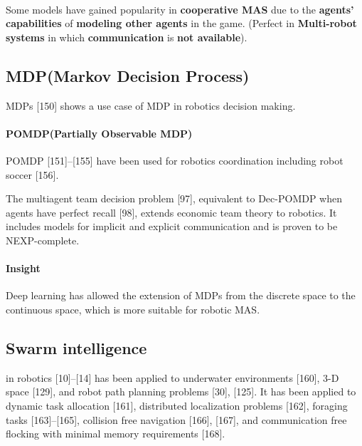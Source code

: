 \documentclass{article}
\begin{document}
   		\\
   		Some models have gained popularity in \textbf{cooperative MAS} due to the \textbf{agents’ capabilities} of \textbf{modeling other agents} in the game. (Perfect in \textbf{Multi-robot systems} in which \textbf{communication} is \textbf{not available})\citep{rizk-2018-decision-making-in-multiagent-systems-a-survey}.
   		
   		\subsection{MDP(Markov Decision Process)}
   			MDPs \citet{rizk-2019-cooperative-heterogeneous-multi-robot-systems-a-survey}[150] shows a use case of MDP in robotics decision making.  
   			
   			\paragraph{POMDP(Partially Observable MDP)} POMDP \cite{rizk-2018-decision-making-in-multiagent-systems-a-survey}[151]–[155] have been used for robotics coordination including robot soccer \citet{rizk-2018-decision-making-in-multiagent-systems-a-survey}[156].
   			
			The multiagent team decision problem \citet{rizk-2018-decision-making-in-multiagent-systems-a-survey}[97], equivalent to Dec-POMDP when agents have perfect recall \cite{rizk-2018-decision-making-in-multiagent-systems-a-survey}[98], extends economic team theory to robotics.  It includes models for implicit and explicit communication and is proven to be NEXP-complete. 
			
			\paragraph{Insight}  Deep learning has allowed the extension of MDPs from the discrete space to the
			continuous space, which is more suitable for robotic MAS.
			
   		
   		\subsection{Swarm intelligence}
   		in robotics \citet{rizk-2018-decision-making-in-multiagent-systems-a-survey}[10]–[14] has been applied to underwater environments \citet{rizk-2018-decision-making-in-multiagent-systems-a-survey}[160], 3-D space \citet{rizk-2018-decision-making-in-multiagent-systems-a-survey}[129], and robot path planning problems \citet{rizk-2018-decision-making-in-multiagent-systems-a-survey}[30], [125]. It has been applied to dynamic task allocation \citet{rizk-2018-decision-making-in-multiagent-systems-a-survey}[161], distributed localization problems \citet{rizk-2018-decision-making-in-multiagent-systems-a-survey}[162], foraging tasks \citet{rizk-2018-decision-making-in-multiagent-systems-a-survey}[163]–[165], collision free navigation \citet{rizk-2018-decision-making-in-multiagent-systems-a-survey}[166], [167], and communication free flocking with minimal memory requirements \citet{rizk-2018-decision-making-in-multiagent-systems-a-survey}[168].  
   		
\end{document}
